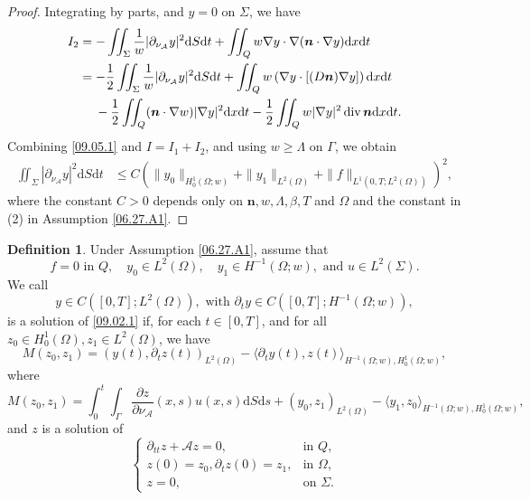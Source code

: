 \documentclass[preprint,12pt]{elsarticle}
\theoremstyle{definition}   %
\newtheorem{definition}[theorem]{Definition}
\numberwithin{equation}{section}
\def\pt{\partial}
\def\bs{\boldsymbol}
\def\lg{\langle}
\def\rg{\rangle}
\def\pt{\partial}
\def\Om{\Omega}
\def\be{\beta}
\def\Ga{\Gamma}
\def\La{\Lambda}
\def\f{\frac}
\def\df{\mathrm d}
\def\mcA{\mathcal{A}}
\DeclareMathOperator{\Div}{div}
\begin{document}
\begin{proof}
	Integrating by parts, and $y=0$ on $\Sigma$, we have 
	\begin{equation*}
		\begin{split}
			I_2
			&=-\iint_\Sigma \f{1}{w}|\pt_{\nu_\mcA} y|^2\df S\df t+\iint_Q w\nabla y\cdot \nabla (\bs{n}\cdot \nabla y)\df x\df t\\
			&=-\f{1}{2}\iint_\Sigma \f{1}{w}|\pt_{\nu_\mcA} y|^2\df S\df t+\iint_Q w \left(\nabla y\cdot [(D\bs{n})\nabla y]\right) \df x\df t\\
			&\hspace{4.5mm}-\f{1}{2}\iint_Q (\bs{n}\cdot \nabla w)|\nabla y|^2\df x\df t-\f{1}{2}\iint_Q w|\nabla y|^2\Div \bs{n}\df x\df t. 
		\end{split}
	\end{equation*}
	Combining \eqref{09.05.1} and $I=I_1+I_2$, and using $w\geq \Lambda$ on $\Gamma$, we obtain 
	\begin{equation*}
		\begin{split}
			\iint_\Sigma |\pt_{\nu_\mcA} y|^2\df S\df t
			&\leq C\left(\|y_0\|_{H_0^1(\Om;w)}+\|y_1\|_{L^2(\Om)}+\|f\|_{L^1(0,T;L^2(\Om))}\right)^2,
		\end{split}
	\end{equation*}
	where the constant $C>0$ depends only on $\bs{n}, w, \La, \be, T$ and $\Om$ and the constant in (2) in Assumption \ref{06.27.A1}. 
\end{proof}



\begin{definition}\label{09.04.D1}
	Under Assumption \ref{06.27.A1}, assume that 
	\begin{equation*}
		f=0 \mbox{ in }Q, \quad y_0\in L^2(\Om), \quad y_1\in H^{-1}(\Om;w), \mbox{ and } u\in L^2(\Sigma). 
	\end{equation*}
	We call 
	\begin{equation*}
		y\in C([0,T]; L^2(\Om)), \mbox{ with } \pt_ty \in C([0,T]; H^{-1}(\Om;w)), 
	\end{equation*} 
	is a solution of \eqref{09.02.1}  if,  for each $t\in [0,T]$, and for all  $z_0\in H_0^1(\Om),z_1\in L^2(\Om)$, we have 
	\begin{equation}\label{09.12.1}
		M(z_0,z_1)=(y(t), \pt_t z(t))_{L^2(\Om)}-\lg \pt_ty(t), z(t)\rg_{H^{-1}(\Om;w), H_0^1(\Om;w)}, 
	\end{equation}
	where 
	\begin{equation*}
		M(z_0,z_1)=\int_0^t\int_\Ga  \f{\pt z}{\pt \nu_\mcA}(x,s) u(x,s)\df S\df s+(y_0, z_1)_{L^2(\Om)}-\lg y_1, z_0\rg_{H^{-1}(\Om;w), H_0^1(\Om;w)}, 
	\end{equation*}
	and $z$ is a solution of 
	\begin{equation*}
		\begin{cases}
			\pt_{tt}z+\mcA z=0, &\mbox{in }Q,\\
			z(0)=z_0, \pt_tz(0)=z_1, &\mbox{in }\Om,\\
			z=0, &\mbox{on }\Sigma. 
		\end{cases}
	\end{equation*} 
\end{definition}
\end{document}
